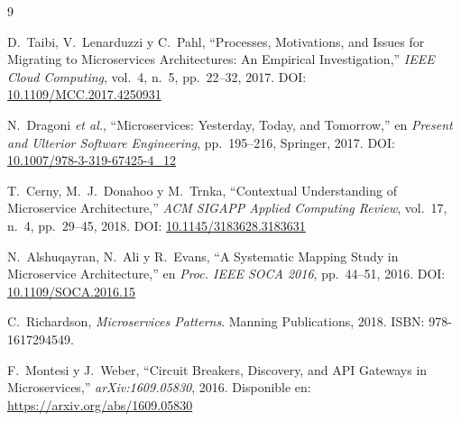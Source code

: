 \documentclass[12pt,a4paper]{article}
\begin{document}
\begin{thebibliography}{9}

D.~Taibi, V.~Lenarduzzi y C.~Pahl,
``Processes, Motivations, and Issues for Migrating to Microservices
Architectures: An Empirical Investigation,''
\emph{IEEE Cloud Computing}, vol.~4, n.\textordmasculine~5, pp.~22--32, 2017.
DOI: \href{https://doi.org/10.1109/MCC.2017.4250931}
          {10.1109/MCC.2017.4250931}

N.~Dragoni \textit{et al.},
``Microservices: Yesterday, Today, and Tomorrow,''
en \emph{Present and Ulterior Software Engineering},
pp.~195--216, Springer, 2017.
DOI: \href{https://doi.org/10.1007/978-3-319-67425-4_12}
          {10.1007/978-3-319-67425-4\_12}

T.~Cerny, M.~J.~Donahoo y M.~Trnka,
``Contextual Understanding of Microservice Architecture,''
\emph{ACM SIGAPP Applied Computing Review}, vol.~17, n.\textordmasculine~4,
pp.~29--45, 2018.
DOI: \href{https://doi.org/10.1145/3183628.3183631}
          {10.1145/3183628.3183631}

N.~Alshuqayran, N.~Ali y R.~Evans,
``A Systematic Mapping Study in Microservice Architecture,''
en \emph{Proc. IEEE SOCA 2016}, pp.~44--51, 2016.
DOI: \href{https://doi.org/10.1109/SOCA.2016.15}
          {10.1109/SOCA.2016.15}

C.~Richardson,
\emph{Microservices Patterns}.
Manning Publications, 2018.
ISBN: 978-1617294549.

F.~Montesi y J.~Weber,
``Circuit Breakers, Discovery, and API Gateways in Microservices,''
\emph{arXiv:1609.05830}, 2016.
Disponible en: \href{https://arxiv.org/abs/1609.05830}
                    {https://arxiv.org/abs/1609.05830}

\end{thebibliography}
\end{document}

